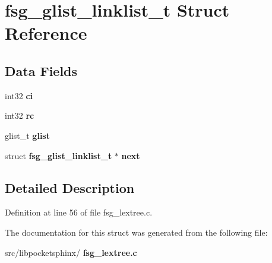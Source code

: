 \section{fsg\+\_\+glist\+\_\+linklist\+\_\+t Struct Reference}
\label{structfsg__glist__linklist__t}
\subsection*{Data Fields}
\begin{DoxyCompactItemize}
\item 
\mbox{\label{structfsg__glist__linklist__t_aee967d5f9700245d9bf02f22d730fe86}} 
int32 {\bfseries ci}
\item 
\mbox{\label{structfsg__glist__linklist__t_ad5fd289a4223f35f2f87b974cbc6bd81}} 
int32 {\bfseries rc}
\item 
\mbox{\label{structfsg__glist__linklist__t_a2bc9d5102b5a082d3ece84ac4dca51be}} 
glist\+\_\+t {\bfseries glist}
\item 
\mbox{\label{structfsg__glist__linklist__t_ae6b27b46998d4c2ee400ef828c3cbe57}} 
struct \textbf{ fsg\+\_\+glist\+\_\+linklist\+\_\+t} $\ast$ {\bfseries next}
\end{DoxyCompactItemize}


\subsection{Detailed Description}


Definition at line 56 of file fsg\+\_\+lextree.\+c.



The documentation for this struct was generated from the following file\+:\begin{DoxyCompactItemize}
\item 
src/libpocketsphinx/\textbf{ fsg\+\_\+lextree.\+c}\end{DoxyCompactItemize}
